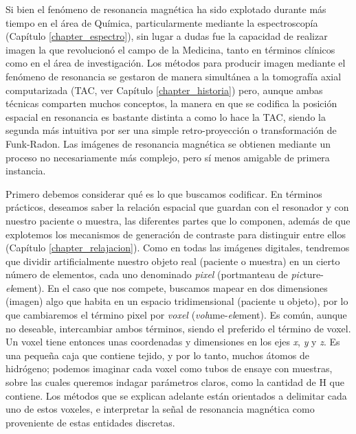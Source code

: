 
Si bien el fenómeno de resonancia magnética ha sido explotado durante más tiempo en el área de Química, particularmente mediante la espectroscopía (Capítulo \ref{chapter_espectro}), sin lugar a dudas fue la capacidad de realizar imagen la que revolucionó el campo de la Medicina, tanto en términos clínicos como en el área de investigación. Los métodos para producir imagen mediante el fenómeno de resonancia se gestaron de manera simultánea a la tomografía axial computarizada (TAC, ver Capítulo \ref{chapter_historia}) pero, aunque ambas técnicas comparten muchos conceptos, la manera en que se codifica la posición espacial en resonancia es bastante distinta a como lo hace la TAC, siendo la segunda más intuitiva por ser una simple retro-proyección o transformación de Funk-Radon. Las imágenes de resonancia magnética se obtienen mediante un proceso no necesariamente más complejo, pero sí menos amigable de primera instancia. 

Primero debemos considerar qué es lo que buscamos codificar. En términos prácticos, deseamos saber la relación espacial que guardan con el resonador y con nuestro paciente o muestra, las diferentes partes que lo componen, además de que explotemos los mecanismos de generación de contraste para distinguir entre ellos (Capítulo \ref{chapter_relajacion}). Como en todas las imágenes digitales, tendremos que dividir artificialmente nuestro objeto real (paciente o muestra) en un cierto número de elementos, cada uno denominado  \emph{pixel} (portmanteau de \emph{pic}ture-\emph{el}ement). En el caso que nos compete, buscamos mapear en dos dimensiones (imagen) algo que habita en un espacio tridimensional (paciente u objeto), por lo que cambiaremos el término pixel por  \emph{voxel} (\emph{vol}ume-\emph{el}ement). Es común, aunque no deseable, intercambiar ambos términos, siendo el preferido el término de voxel. Un voxel tiene entonces unas coordenadas y dimensiones en los ejes \textit{x}, \textit{y} y \textit{z}. Es una pequeña caja que contiene tejido, y por lo tanto, muchos átomos de hidrógeno; podemos imaginar cada voxel como tubos de ensaye con muestras, sobre las cuales queremos indagar parámetros claros, como la cantidad de H que contiene. Los métodos que se explican adelante están orientados a delimitar cada uno de estos voxeles, e interpretar la señal de resonancia magnética como proveniente de estas entidades discretas.

